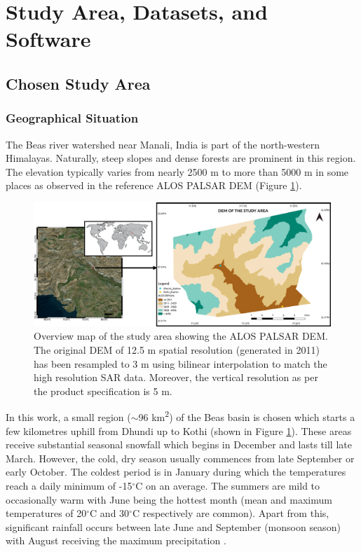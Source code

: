 \documentclass[12pt]{elsarticle}
\numberwithin{equation}{section}
\numberwithin{figure}{section}
\numberwithin{table}{section}
\begin{document}
\section{Study Area, Datasets, and Software}
\label{sec:study}

\subsection{Chosen Study Area}
\subsubsection{Geographical Situation}
\label{sssec:geo}
The Beas river watershed near Manali, India is part of the north-western Himalayas. Naturally, steep slopes and dense forests are prominent in this region. The elevation typically varies from nearly 2500 m to more than 5000 m in some places as observed in the reference ALOS PALSAR DEM (Figure \ref{fig:overview}). 

\begin{figure}[htb]
    \centering
    \includegraphics[width=\textwidth]{Figures/Overview.png}
    \caption{Overview map of the study area showing the ALOS PALSAR DEM. The original DEM of 12.5 m spatial resolution (generated in 2011) has been resampled to 3 m using bilinear interpolation \citep{Wu2008} to match the high resolution SAR data. Moreover, the vertical resolution as per the product specification is 5 m.}
    \label{fig:overview}
\end{figure}

In this work, a small region ($\sim$96 km\textsuperscript{2}) of the Beas basin is chosen which starts a few kilometres uphill from Dhundi up to Kothi (shown in Figure \ref{fig:overview}). These areas receive substantial seasonal snowfall which begins in December and lasts till late March. However, the cold, dry season usually commences from late September or early October. The coldest period is in January during which the temperatures reach a daily minimum of -15$^\circ$C on an average. The summers are mild to occasionally warm with June being the hottest month (mean and maximum temperatures of 20$^\circ$C and 30$^\circ$C respectively are common). Apart from this, significant rainfall occurs between late June and September (monsoon season) with August receiving the maximum precipitation \citep{Majumdar2019, Thakur2012}.
\end{document}
